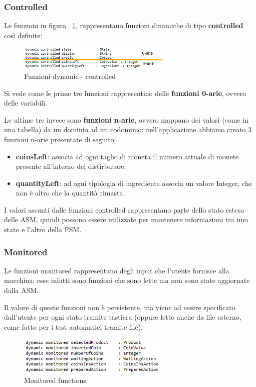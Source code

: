 \subsubsection{Controlled}
Le funzioni in figura ~\ref{fig:controlled}, rappresentano funzioni dinamiche di tipo \textbf{controlled} così definite:
\begin{figure}[h]
	\centering
	\includegraphics[width=0.65\textwidth]{Immagini/DynamicController.png}
	\caption{Funzioni dynamic - controlled}
	\label{fig:controlled}
\end{figure}

Si vede come le prime tre funzioni rappresentino delle \textbf{funzioni 0-arie}, ovvero delle variabili.

Le ultime tre invece sono \textbf{funzioni n-arie}, ovvero mappano dei valori (come in una tabella) da un dominio ad un codominio: nell'applicazione abbiamo creato 3 funzioni n-arie presentate di seguito:
\begin{itemize}
	\item \textbf{coinsLeft}: associa ad ogni taglio di moneta il numero attuale di monete presente all'interno del distirbutore;
	\item \textbf{quantityLeft}: ad ogni tipologia di ingrediente associa un valore Integer, che non è altro che la quantità rimasta.
\end{itemize}

I valori assunti dalle funzioni controlled rappresentano parte dello stato esteso delle ASM, quindi possono essere utilizzate per mantenere informazioni tra uno stato e l’altro della FSM.

\subsubsection{Monitored}
Le funzioni monitored rappresentano degli input che l’utente fornisce alla macchina: esse infatti sono funzioni che sono lette ma non sono state aggiornate dalla ASM.

Il valore di queste funzioni non è persistente, ma viene ad essere specificato dall’utente per ogni stato tramite tastiera (oppure letto anche da file esterno, come fatto per i test automatici tramite file).


\begin{figure}[h]
	\centering
	\includegraphics[width=0.65\textwidth]{Immagini/MonitoredFunc.png}
	\caption{Monitored functions}
	\label{fig:monitoredFunc}
\end{figure}

